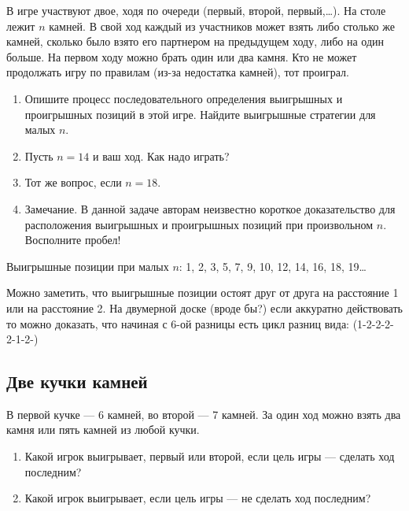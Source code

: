 \begin{problem}
\begin{source}
\cite{savva:nmu}
\end{source}
 В игре участвуют двое, ходя по очереди (первый, второй, первый,\ldots ). На столе лежит $n$ камней. В свой ход каждый из участников может взять либо столько же камней, сколько было взято его партнером на предыдущем ходу, либо на один больше. На первом ходу можно брать один или два камня. Кто не может продолжать игру по правилам (из-за недостатка камней), тот проиграл.
\begin{enumerate}
\item Опишите процесс последовательного определения выигрышных и проигрышных позиций в этой игре. Найдите выигрышные стратегии для малых $n$.
\item Пусть $n=14$ и ваш ход. Как надо играть?
\item  Тот же вопрос, если $n=18$.
\item Замечание. В данной задаче авторам неизвестно короткое доказательство для  расположения выигрышных и проигрышных позиций при произвольном $n$. Восполните пробел!
\end{enumerate}






\begin{sol}
Выигрышные позиции при малых $n$: 1, 2, 3, 5, 7, 9, 10, 12, 14, 16, 18, 19\ldots

Можно заметить, что выигрышные позиции остоят друг от друга на расстояние 1 или на расстояние 2. На двумерной доске (вроде бы?)  если аккуратно действовать то можно доказать, что начиная с 6-ой разницы есть цикл разниц вида: (1-2-2-2-2-1-2-)
\end{sol}
\end{problem}

\subsection{Две кучки камней}

\begin{problem}\par
В первой кучке --- 6 камней, во второй --- 7 камней. За один ход можно взять два камня или пять камней из любой кучки.\par
\begin{enumerate}
\item	Какой игрок выигрывает, первый или второй, если цель игры --- сделать ход последним?\par
\item	Какой игрок выигрывает, если цель игры --- не сделать ход последним?
\end{enumerate}


\begin{sol}

\end{sol}
\end{problem}


